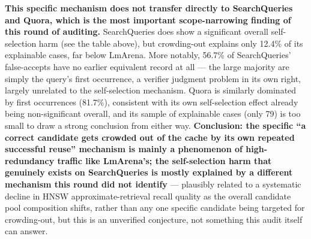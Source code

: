 \documentclass[11pt]{article}
\begin{document}
\textbf{This specific mechanism does not transfer directly to SearchQueries and Quora, which is the most important scope-narrowing finding of this round of auditing.} SearchQueries does show a significant overall self-selection harm (see the table above), but crowding-out explains only 12.4\% of its explainable cases, far below LmArena. More notably, 56.7\% of SearchQueries' false-accepts have no earlier equivalent record at all --- the large majority are simply the query's first occurrence, a verifier judgment problem in its own right, largely unrelated to the self-selection mechanism. Quora is similarly dominated by first occurrences (81.7\%), consistent with its own self-selection effect already being non-significant overall, and its sample of explainable cases (only 79) is too small to draw a strong conclusion from either way. \textbf{Conclusion: the specific ``a correct candidate gets crowded out of the cache by its own repeated successful reuse'' mechanism is mainly a phenomenon of high-redundancy traffic like LmArena's; the self-selection harm that genuinely exists on SearchQueries is mostly explained by a different mechanism this round did not identify} --- plausibly related to a systematic decline in HNSW approximate-retrieval recall quality as the overall candidate pool composition shifts, rather than any one specific candidate being targeted for crowding-out, but this is an unverified conjecture, not something this audit itself can answer.
\end{document}
